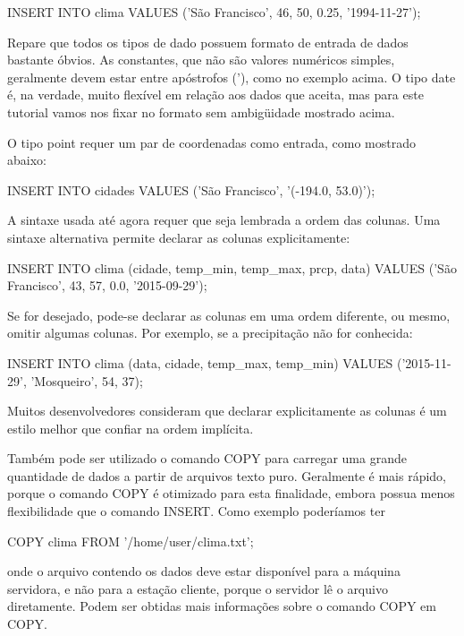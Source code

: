 \begin{BoxVerbatim}
INSERT INTO clima VALUES ('São Francisco', 46, 50, 0.25, '1994-11-27');
\end{BoxVerbatim}

Repare que todos os tipos de dado possuem formato de entrada de dados bastante óbvios. As constantes, que não são valores numéricos simples, geralmente devem estar entre apóstrofos ('), como no exemplo acima. O tipo date é, na verdade, muito flexível em relação aos dados que aceita, mas para este tutorial vamos nos fixar no formato sem ambigüidade mostrado acima.

O tipo point requer um par de coordenadas como entrada, como mostrado abaixo:

\begin{BoxVerbatim}
INSERT INTO cidades VALUES ('São Francisco', '(-194.0, 53.0)');
\end{BoxVerbatim}
A sintaxe usada até agora requer que seja lembrada a ordem das colunas. Uma sintaxe alternativa permite declarar as colunas explicitamente:

\begin{BoxVerbatim}
INSERT INTO clima (cidade, temp_min, temp_max, prcp, data)
    VALUES ('São Francisco', 43, 57, 0.0, '2015-09-29');
\end{BoxVerbatim}
Se for desejado, pode-se declarar as colunas em uma ordem diferente, ou mesmo, omitir algumas colunas. Por exemplo, se a precipitação não for conhecida:

\begin{BoxVerbatim}
INSERT INTO clima (data, cidade, temp_max, temp_min)
    VALUES ('2015-11-29', 'Mosqueiro', 54, 37);
\end{BoxVerbatim}
Muitos desenvolvedores consideram que declarar explicitamente as colunas é um estilo melhor que confiar na ordem implícita.

Também pode ser utilizado o comando COPY para carregar uma grande quantidade de dados a 
partir de arquivos texto puro. Geralmente é mais rápido, porque o comando COPY é 
otimizado para esta finalidade, embora possua menos flexibilidade que o comando INSERT. Como exemplo poderíamos ter

\begin{BoxVerbatim}
COPY clima FROM '/home/user/clima.txt';
\end{BoxVerbatim}
onde o arquivo contendo os dados deve estar disponível para a máquina servidora, e não para a estação cliente, 
porque o servidor lê o arquivo diretamente. Podem ser obtidas mais informações sobre o comando COPY em COPY.

